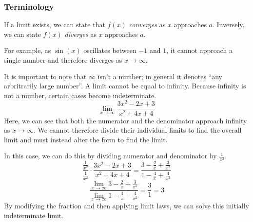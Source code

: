\documentclass[12pt]{report}
\newcommand{\limit}{\lim\limits}
\begin{document}
\begin{flushleft}
\subsubsection*{Terminology}
If a limit exists, we can state that \(f(x)\) \textit{converges} as \(x\) 
approaches \(a\). Inversely, we can state \(f(x)\) \textit{diverges} as \(x\)
approaches \(a\). \par
For example, as \(\sin(x)\) oscillates between \(-1\) and \(1\), it cannot 
approach a single number and therefore diverges as \(x\rightarrow\infty\). \par
It is important to note that \(\infty\) isn't a number; in general it denotes
``any arbritrarily large number''. A limit cannot be equal to infinity. Because
infinity is not a number, certain cases become indeterminate.
\[\limit_{x\rightarrow\infty} \frac{3x^2 - 2x + 3}{x^2 + 4x + 4}\]
Here, we can see that both the numerator and the denominator approach infinity
as \(x\rightarrow\infty\). We cannot therefore divide their individual limits 
to find the overall limit and must instead alter the form to find the limit. 
\par
In this case, we can do this by dividing numerator and denominator by 
\(\frac{1}{x^2}\).
\[\frac{\frac{1}{x^2}}{\frac{1}{x^2}} \cdot \frac{3x^2 - 2x + 3}{x^2 + 4x + 4}
= \frac{3 - \frac{2}{x} + \frac{3}{x^2}}{1 - \frac{4}{x} + \frac{4}{x^2}}\]
\[\frac{\limit_{x\rightarrow\infty} 3 - \frac{2}{x} + \frac{3}{x^2}}{
\limit_{x\rightarrow\infty} 1 - \frac{4}{x} + \frac{4}{x^2}} = 
\frac{3}{1} = 3\]
By modifying the fraction and then applying limit laws, we can solve this 
initially indeterminate limit.


\end{flushleft}
\end{document}
